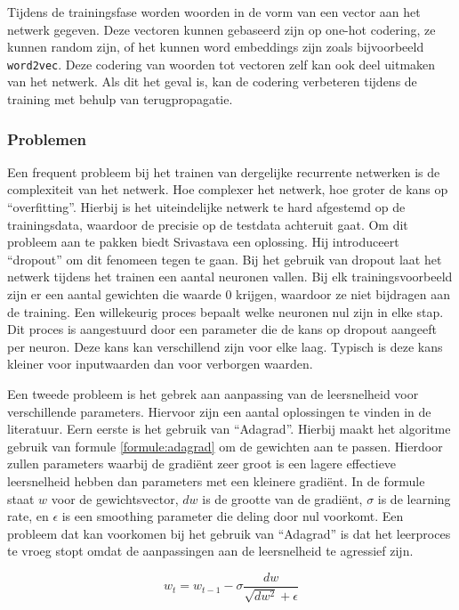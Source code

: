 Tijdens de trainingsfase worden woorden in de vorm van een vector aan het netwerk gegeven. Deze vectoren kunnen gebaseerd zijn op one-hot codering, ze kunnen random zijn, of het kunnen word embeddings zijn zoals bijvoorbeeld \texttt{word2vec}\cite{Mikolov2013}. Deze codering van woorden tot vectoren zelf kan ook deel uitmaken van het netwerk. Als dit het geval is, kan de codering verbeteren tijdens de training met behulp van terugpropagatie.

\subsubsection{Problemen}

Een frequent probleem bij het trainen van dergelijke recurrente netwerken is de complexiteit van het netwerk. Hoe complexer het netwerk, hoe groter de kans op ``overfitting''. Hierbij is het uiteindelijke netwerk te hard afgestemd op de trainingsdata, waardoor de precisie op de testdata achteruit gaat. Om dit probleem aan te pakken biedt Srivastava\cite{Srivastava2013} een oplossing. Hij introduceert ``dropout'' om dit fenomeen tegen te gaan. Bij het gebruik van dropout laat het netwerk tijdens het trainen een aantal neuronen vallen. Bij elk trainingsvoorbeeld zijn er een aantal gewichten die waarde 0 krijgen, waardoor ze niet bijdragen aan de training. Een willekeurig proces bepaalt welke neuronen nul zijn in elke stap. Dit proces is aangestuurd door een parameter die de kans op dropout aangeeft per neuron. Deze  kans kan verschillend zijn voor elke laag. Typisch is deze kans kleiner voor inputwaarden dan voor verborgen waarden.

Een tweede probleem is het gebrek aan aanpassing van de leersnelheid voor verschillende parameters. Hiervoor zijn een aantal oplossingen te vinden in de literatuur. Eern eerste is het gebruik van ``Adagrad''\cite{Duchi2011}. Hierbij maakt het algoritme gebruik van formule \eqref{formule:adagrad} om de gewichten aan te passen. Hierdoor zullen parameters waarbij de gradi\"ent zeer groot is een lagere effectieve leersnelheid hebben dan parameters met een kleinere gradi\"ent. In de formule staat $w$ voor de gewichtsvector, $dw$ is de grootte van de gradi\"ent, $\sigma$ is de learning rate, en $\epsilon$ is een smoothing parameter die deling door nul voorkomt. Een probleem dat kan voorkomen bij het gebruik van ``Adagrad'' is dat het leerproces te vroeg stopt omdat de aanpassingen aan de leersnelheid te agressief zijn.
 
\begin{equation}
    w_t = w_{t-1} - \sigma \frac{dw}{\sqrt{dw^2} + \epsilon}
    \label{formule:adagrad}
\end{equation}

